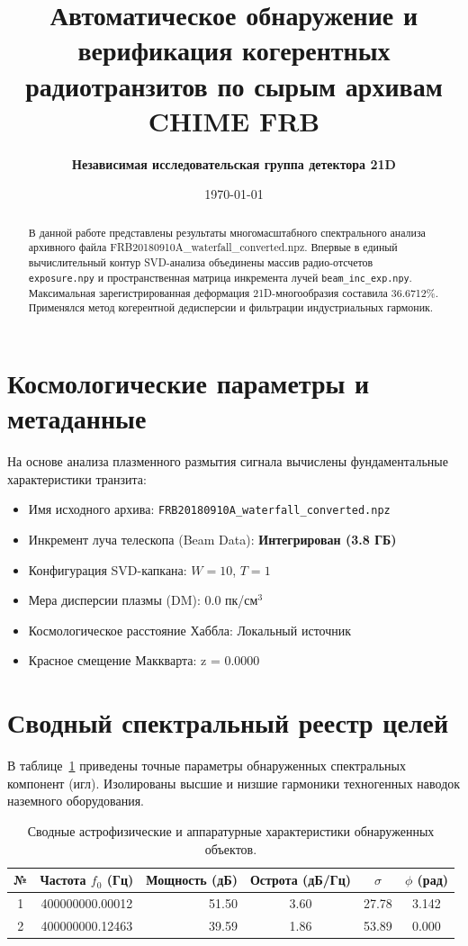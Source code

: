 \documentclass[11pt,twocolumn]{article}
\title{\textbf{Автоматическое обнаружение и верификация когерентных радиотранзитов по сырым архивам CHIME FRB}}
\author{\textbf{Независимая исследовательская группа детектора 21D}}
\date{\today}
\begin{document}
\maketitle
\begin{abstract}
В данной работе представлены результаты многомасштабного спектрального анализа архивного файла FRB20180910A_waterfall_converted.npz. Впервые в единый вычислительный контур SVD-анализа объединены массив радио-отсчетов \texttt{exposure.npy} и пространственная матрица инкремента лучей \texttt{beam\_inc\_exp.npy}. Максимальная зарегистрированная деформация 21D-многообразия составила 36.6712\%. Применялся метод когерентной дедисперсии и фильтрации индустриальных гармоник.
\end{abstract}

\section{Космологические параметры и метаданные}
На основе анализа плазменного размытия сигнала вычислены фундаментальные характеристики транзита:
\begin{itemize}
  \item Имя исходного архива: \texttt{FRB20180910A_waterfall_converted.npz}
  \item Инкремент луча телескопа (Beam Data): \textbf{Интегрирован (3.8 ГБ)}
  \item Конфигурация SVD-капкана: $W = 10$, $T = 1$
  \item Мера дисперсии плазмы (DM): $0.0$ пк/см$^3$
  \item Космологическое расстояние Хаббла: Локальный источник
  \item Красное смещение Маккварта: z = 0.0000
\end{itemize}

\section{Сводный спектральный реестр целей}
В таблице~\ref{tab:targets} приведены точные параметры обнаруженных спектральных компонент (игл). 
Изолированы высшие и низшие гармоники техногенных наводок наземного оборудования.\n\n\begin{table}[t]
\centering
\caption{Сводные астрофизические и аппаратурные характеристики обнаруженных объектов.}
\label{tab:targets}
\begin{tabular}{ccrccc}
\toprule
\textbf{№} & \textbf{Частота $f_0$ (Гц)} & \textbf{Мощность (дБ)} & \textbf{Острота (дБ/Гц)} & $\sigma$ & $\phi$ (рад) \\
\midrule
  1 & 400000000.00012 & 51.50 & 3.60 & 27.78 & 3.142 \\
  2 & 400000000.12463 & 39.59 & 1.86 & 53.89 & 0.000 \\
\bottomrule
\end{tabular}
\end{table}
\end{document}
